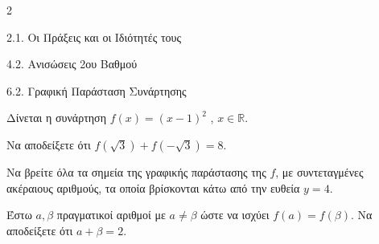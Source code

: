 \begin{ylh}{2}
    \item 2.1. Οι Πράξεις και οι Ιδιότητές τους
    \item 4.2. Ανισώσεις 2ου Βαθμού
    \item 6.2. Γραφική Παράσταση Συνάρτησης
\end{ylh}
Δίνεται η συνάρτηση $f(x) = (x-1)^2$ , $x \in \mathbb{R}$.
\begin{alist}
\item Να αποδείξετε ότι $f(\sqrt{3}) + f(-\sqrt{3}) = 8$.
\item Να βρείτε όλα τα σημεία της γραφικής παράστασης της $f$, με συντεταγμένες ακέραιους αριθμούς, τα οποία βρίσκονται κάτω από την ευθεία $y = 4$.
\item Έστω $a, \beta$ πραγματικοί αριθμοί με $a \neq \beta$ ώστε να ισχύει $f(a) = f(\beta)$. Να αποδείξετε ότι $a + \beta = 2$.
\end{alist}

